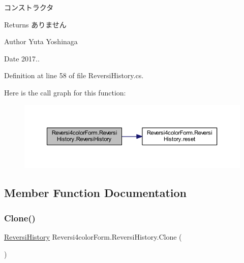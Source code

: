 コンストラクタ 

\begin{DoxyReturn}{Returns}
ありません 
\end{DoxyReturn}
\begin{DoxyAuthor}{Author}
Yuta Yoshinaga 
\end{DoxyAuthor}
\begin{DoxyDate}{Date}
2017.. 
\end{DoxyDate}


Definition at line 58 of file Reversi\+History.\+cs.

Here is the call graph for this function\+:
\nopagebreak
\begin{figure}[H]
\begin{center}
\leavevmode
\includegraphics[width=350pt]{class_reversi4color_form_1_1_reversi_history_a90caf6857e6bae3a51be28ac48cd7d70_cgraph}
\end{center}
\end{figure}


\subsection{Member Function Documentation}
\mbox{\label{class_reversi4color_form_1_1_reversi_history_aaa0fdae109a1965a1dec3632119950bd}} 
\subsubsection{\texorpdfstring{Clone()}{Clone()}}
{\footnotesize\ttfamily \hyperlink{class_reversi4color_form_1_1_reversi_history}{Reversi\+History} Reversi4color\+Form.\+Reversi\+History.\+Clone (\begin{DoxyParamCaption}{ }\end{DoxyParamCaption})}



